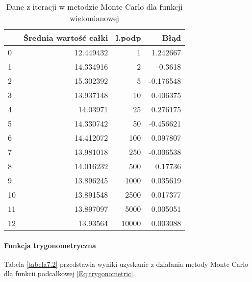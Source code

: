 \documentclass[12pt,twoside]{article}
\begin{document}
\begin{table}[H]
\centering 
\caption{Dane z iteracji w metodzie Monte Carlo dla funkcji wielomianowej}
\label{tabela7.1}
\begin{tabular}{lrrr}
\toprule
{} &  Średnia wartość całki &  l.podp &      Błąd \\
\midrule
0  &              12.449432 &       1 &  1.242667 \\
1  &              14.334916 &       2 & -0.3618 \\
2  &              15.302392 &       5 & -0.176548 \\
3  &              13.937148 &      10 &  0.406375 \\
4  &               14.03971 &      25 &  0.276175 \\
5  &              14.330742 &      50 & -0.456621 \\
6  &              14.412072 &     100 &  0.097807 \\
7  &              13.981018 &     250 & -0.006538 \\
8  &              14.016232 &     500 &  0.17736 \\
9  &              13.896245 &    1000 &  0.035619 \\
10 &              13.891548 &    2500 &  0.017377 \\
11 &              13.897097 &    5000 &  0.005051 \\
12 &               13.93564 &   10000 &  0.003088 \\
\bottomrule
\end{tabular}
\end{table}

\paragraph{Funkcja trygonometryczna}

Tabela \eqref{tabela7.2} przedstawia wyniki uzyskanie z działania metody Monte Carlo dla funkcii podcałkowej \eqref{Eq:trygonometric}.
\end{document}
